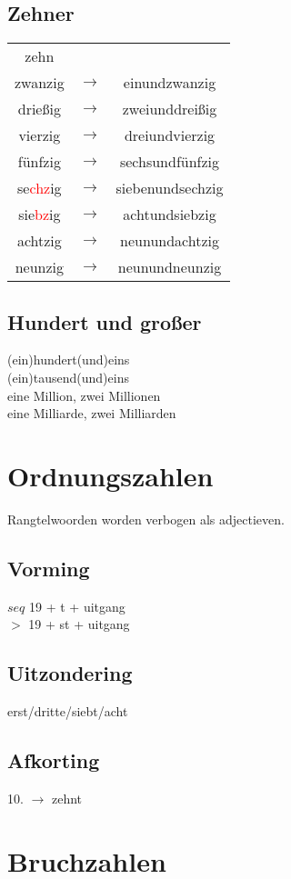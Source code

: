 \documentclass[main.tex]{subfiles}
\begin{document}
\begin{minipage}{0,5\textwidth}
\subsection{Zehner}
\begin{tabular}{ccc}
zehn &  &  \\ 
zwanzig & $\rightarrow$ & einundzwanzig \\ 
drießig & $\rightarrow$ & zweiunddreißig \\ 
vierzig & $\rightarrow$ & dreiundvierzig \\ 
fünfzig & $\rightarrow$ & sechsundfünfzig \\ 
se\textcolor{red}{chz}ig & $\rightarrow$ & siebenundsechzig \\ 
sie\textcolor{red}{bz}ig & $\rightarrow$ & achtundsiebzig \\ 
achtzig & $\rightarrow$ & neunundachtzig \\ 

neunzig & $\rightarrow$ & neunundneunzig \\ 

\end{tabular} 
\end{minipage}
\subsection{Hundert und großer}
(ein)hundert(und)eins\\
(ein)tausend(und)eins\\
eine Million, zwei Millionen\\
eine Milliarde, zwei Milliarden
\section{Ordnungszahlen}
Rangtelwoorden worden verbogen als adjectieven.
\subsection{Vorming}
$seq$ 19 + t + uitgang\\
$>$ 19 + st + uitgang\\
\subsection{Uitzondering}
erst/dritte/siebt/acht
\subsection{Afkorting}
10. $\rightarrow$ zehnt

\section{Bruchzahlen}
\end{document}
